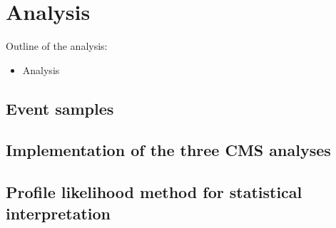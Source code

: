 \section{Analysis}

Outline of the analysis:

\begin{itemize}
\item Analysis
\end{itemize}

\subsection{Event samples}

\subsection{Implementation of the three CMS analyses}

\subsection{Profile likelihood method for statistical interpretation}
